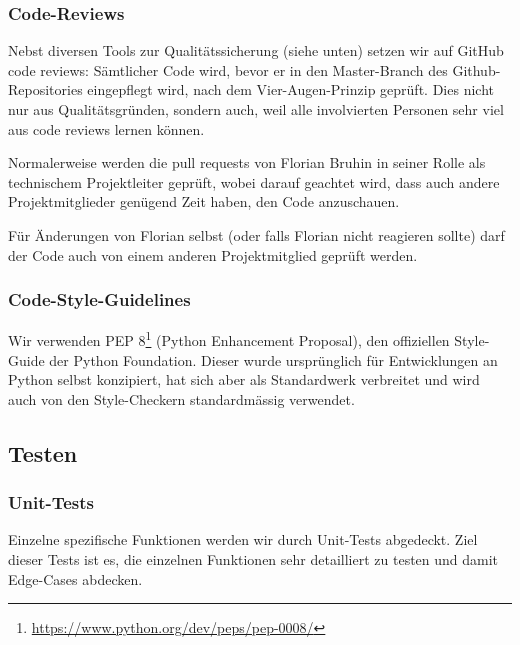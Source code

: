 \documentclass[a4paper]{article}
\begin{document}
\subsubsection{Code-Reviews}
\label{sec:codereviews}

Nebst diversen Tools zur Qualitätssicherung (siehe unten) setzen wir auf GitHub
code reviews: Sämtlicher Code wird, bevor er in den Master-Branch des
Github-Repositories eingepflegt wird, nach dem Vier-Augen-Prinzip geprüft. Dies
nicht nur aus Qualitätsgründen, sondern auch, weil alle involvierten Personen
sehr viel aus code reviews lernen können.

Normalerweise werden die pull requests von Florian Bruhin in seiner Rolle als
technischem Projektleiter geprüft, wobei darauf geachtet wird, dass auch andere
Projektmitglieder genügend Zeit haben, den Code anzuschauen.

Für Änderungen von Florian selbst (oder falls Florian nicht reagieren sollte)
darf der Code auch von einem anderen Projektmitglied geprüft werden.

\subsubsection{Code-Style-Guidelines}
Wir verwenden PEP 8\footnote{\url{https://www.python.org/dev/peps/pep-0008/}}
(Python Enhancement Proposal), den offiziellen Style-Guide der Python
Foundation. Dieser wurde ursprünglich für Entwicklungen an Python selbst
konzipiert, hat sich aber als Standardwerk verbreitet und wird auch von den
Style-Checkern standardmässig verwendet.

\subsection{Testen}

\subsubsection{Unit-Tests}

Einzelne spezifische Funktionen werden wir durch Unit-Tests abgedeckt.
Ziel dieser Tests ist es, die einzelnen Funktionen sehr detailliert zu testen und damit Edge-Cases abdecken.
\end{document}
